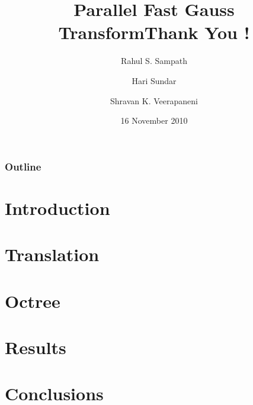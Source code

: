 \documentclass[red]{beamer}
\title{Parallel Fast Gauss Transform}
\author
{
 Rahul S. Sampath \and Hari Sundar \and Shravan K. Veerapaneni   
}
\date{16 November 2010}
\begin{document}
\begin{frame}
 \titlepage
\end{frame}

\begin{frame}
\frametitle{Outline}
\tableofcontents
\end{frame}

\section{Introduction}


\section{Translation}


\section{Octree}


\section{Results}


\section{Conclusions}




\title{Thank You !}
\author{ }
\institute{ }
\date{ }
\begin{frame}
  \titlepage
\end{frame}
\end{document}
